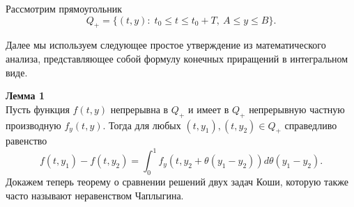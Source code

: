 Рассмотрим прямоугольник
\begin{equation*}
Q_+=\{(t,y):\; t_0\leq t\leq t_0+T,\: A\leq y\leq B\}.
\end{equation*}

Далее мы используем следующее простое утверждение из математического анализа, представляющее собой формулу конечных приращений в интегральном виде.

\textbf{Лемма 1}\\
Пусть функция $f(t,y)$ непрерывна в $Q_+$ и имеет в $Q_+$ непрерывную частную производную $f_y(t,y)$. Тогда для любых $(t,y_1), (t,y_2)\in Q_+$ справедливо равенство
\begin{equation*}\tag{3}
f(t,y_1)-f(t,y_2)=\int_0^1 f_y(t,y_2+\theta(y_1-y_2))d\theta(y_1-y_2).
\end{equation*}
Докажем теперь теорему о сравнении решений двух задач Коши, которую также часто называют  неравенством Чаплыгина.

